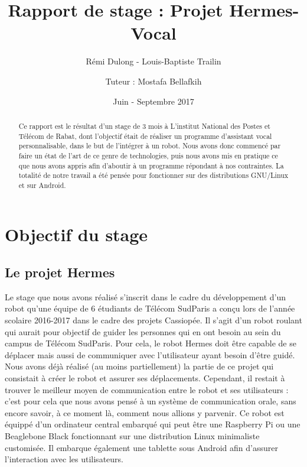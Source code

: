 \documentclass[a4paper,10pt]{report}
\title{Rapport de stage : Projet Hermes-Vocal}
\author{Rémi Dulong - Louis-Baptiste Trailin\and{Tuteur : Mostafa Bellafkih}}
\date{Juin - Septembre 2017}
\begin{document}
    \maketitle
    \newpage

    \begin{abstract}
        {Ce rapport est le résultat d'un stage de 3 mois à L'institut National des Postes et Télécom de Rabat, dont l'objectif était de réaliser un programme d'assistant vocal personnalisable, dans le but de l'intégrer à un robot. Nous avons donc commencé par faire un état de l'art de ce genre de technologies, puis nous avons mis en pratique ce que nous avons appris afin d'aboutir à un programme répondant à nos contraintes. La totalité de notre travail a été pensée pour fonctionner sur des distributions GNU/Linux et sur Android.}
    \end{abstract}

    \tableofcontents
    \newpage

    \chapter{Objectif du stage}

    \section{Le projet Hermes}

    {Le stage que nous avons réalisé s'inscrit dans le cadre du développement d'un robot qu'une équipe de 6 étudiants de Télécom SudParis a conçu lors de l'année scolaire
        2016-2017 dans le cadre des projets Cassiopée. Il s'agit d'un robot roulant qui aurait pour objectif de guider les personnes qui en ont besoin au sein du campus de
        Télécom SudParis. Pour cela, le robot Hermes doit être capable de se déplacer mais aussi de communiquer avec l'utilisateur ayant besoin d'être guidé. Nous avons
        déjà réalisé (au moins partiellement) la partie de ce projet qui consistait à créer le robot et assurer ses déplacements. Cependant, il restait à trouver le meilleur
        moyen de communication entre le robot et ses utilisateurs : c'est pour cela que nous avons pensé à un système de communication orale, sans encore savoir, à ce
        moment là, comment nous allions y parvenir.}
    {Ce robot est équippé d'un ordinateur central embarqué qui peut être une Raspberry Pi ou une Beaglebone Black fonctionnant sur une distribution Linux minimaliste customisée. Il embarque également une tablette sous Android afin d'assurer l'interaction avec les utilisateurs.}
\end{document}
